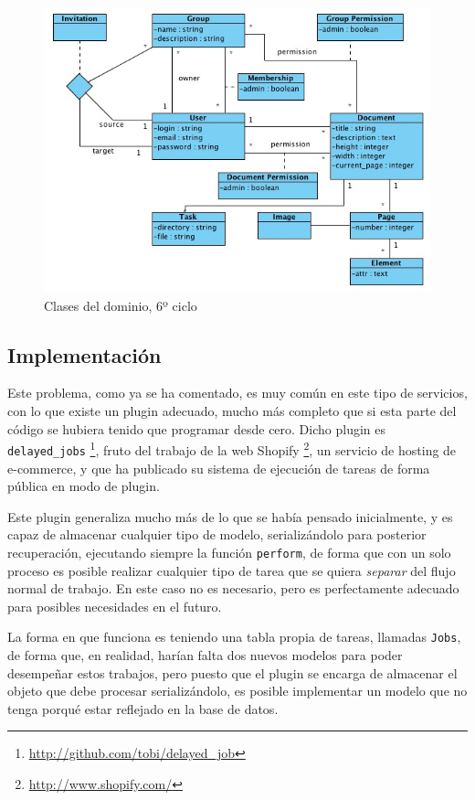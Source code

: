 \begin{figure}[h!]
\centering
\includegraphics[width=14cm]{uml6.png}
\caption{Clases del dominio, 6º ciclo}\label{fig:uml6}
\end{figure}


\subsection{Implementación} %
\label{sub:implementación}

Este problema, como ya se ha comentado, es muy común en este tipo de servicios, con lo que existe un plugin adecuado, mucho más completo que si esta parte del código se hubiera tenido que programar desde cero. Dicho plugin es \texttt{delayed\_jobs} \footnote{\url{http://github.com/tobi/delayed\_job}}, fruto del trabajo de la web Shopify \footnote{\url{http://www.shopify.com/}}, un servicio de hosting de e-commerce, y que ha publicado su sistema de ejecución de tareas de forma pública en modo de plugin.

Este plugin generaliza mucho más de lo que se había pensado inicialmente, y es capaz de almacenar cualquier tipo de modelo, serializándolo para posterior recuperación, ejecutando siempre la función \texttt{perform}, de forma que con un solo proceso es posible realizar cualquier tipo de tarea que se quiera \emph{separar} del flujo normal de trabajo. En este caso no es necesario, pero es perfectamente adecuado para posibles necesidades en el futuro.

La forma en que funciona es teniendo una tabla propia de tareas, llamadas \texttt{Jobs}, de forma que, en realidad, harían falta dos nuevos modelos para poder desempeñar estos trabajos, pero puesto que el plugin se encarga de almacenar el objeto que debe procesar serializándolo, es posible implementar un modelo que no tenga porqué estar reflejado en la base de datos.

